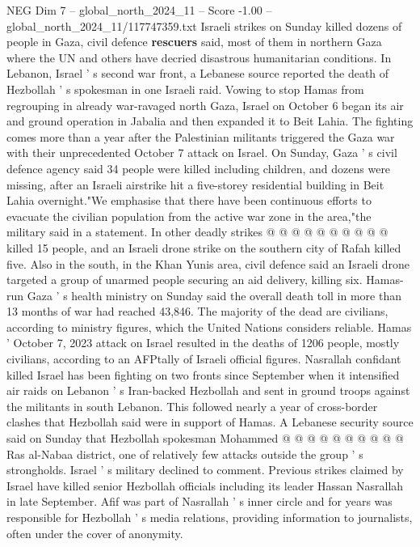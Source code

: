 \begin{textsample}{NEG Dim 7 – global\_north\_2024\_11 – Score -1.00 – global\_north\_2024\_11/117747359.txt}  \label{ex:f7_neg_341}
Israeli strikes on Sunday killed dozens of people in Gaza, civil defence \textbf{rescuers} said, most of them in northern Gaza where the UN and others have decried disastrous humanitarian conditions.
In Lebanon, Israel ' s second war front, a Lebanese source reported the death of Hezbollah ' s spokesman in one Israeli raid.
Vowing to stop Hamas from regrouping in already war-ravaged north Gaza, Israel on October 6 began its air and ground operation in Jabalia and then expanded it to Beit Lahia.
The fighting comes more than a year after the Palestinian militants triggered the Gaza war with their unprecedented October 7 attack on Israel.
On Sunday, Gaza ' s civil defence agency said 34 people were killed including children, and dozens were missing, after an Israeli airstrike hit a five-storey residential building in Beit Lahia overnight."We emphasise that there have been continuous efforts to evacuate the civilian population from the active war zone in the area,"the military said in a statement.
In other deadly strikes @ @ @ @ @ @ @ @ @ @ killed 15 people, and an Israeli drone strike on the southern city of Rafah killed five.
Also in the south, in the Khan Yunis area, civil defence said an Israeli drone targeted a group of unarmed people securing an aid delivery, killing six.
Hamas-run Gaza ' s health ministry on Sunday said the overall death toll in more than 13 months of war had reached 43,846.
The majority of the dead are civilians, according to ministry figures, which the United Nations considers reliable.
Hamas ' October 7, 2023 attack on Israel resulted in the deaths of 1206 people, mostly civilians, according to an AFPtally of Israeli official figures.
Nasrallah confidant killed Israel has been fighting on two fronts since September when it intensified air raids on Lebanon ' s Iran-backed Hezbollah and sent in ground troops against the militants in south Lebanon.
This followed nearly a year of cross-border clashes that Hezbollah said were in support of Hamas.
A Lebanese security source said on Sunday that Hezbollah spokesman Mohammed @ @ @ @ @ @ @ @ @ @ Ras al-Nabaa district, one of relatively few attacks outside the group ' s strongholds.
Israel ' s military declined to comment.
Previous strikes claimed by Israel have killed senior Hezbollah officials including its leader Hassan Nasrallah in late September.
Afif was part of Nasrallah ' s inner circle and for years was responsible for Hezbollah ' s media relations, providing information to journalists, often under the cover of anonymity.

\end{textsample}
